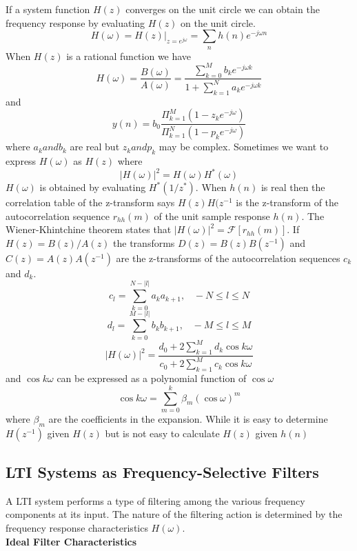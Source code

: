 \documentclass{article} %
\begin{document}
	If a system function $H(z)$ converges on the unit circle we can obtain the frequency response by evaluating $H(z)$ on the unit circle. 
	\begin{equation}
	H(\omega) = H(z)|_{z=e^{j\omega}} = \sum_n h(n)e^{-j\omega n}
	\end{equation}
	When $H(z)$ is a rational function we have
	\begin{equation}
	H(\omega) = \frac{B(\omega)}{A(\omega)} = \frac{\sum_{k=0}^M b_ke^{-j\omega k}}{1 + \sum_{k=1}^N a_k e^{-j\omega k}}
	\end{equation}
	and
	\begin{equation}
	y(n) = b_0 \frac{\Pi_{k=1}^M (1-z_ke^{-j\omega})}{\Pi_{k=1}^N (1-p_ke^{-j\omega})}
	\end{equation}
	where $a_k and b_k$ are real but $z_k and p_k$ may be complex. Sometimes we want to express $H(\omega)$ as $H(z)$ where 
	\begin{equation}
	|H(\omega)|^2 = H(\omega)H^*(\omega)
	\end{equation}
	$H(\omega)$ is obtained by evaluating $H^*(1/z^*)$. When $h(n)$ is real then the correlation table of the z-transform says $H(z)H(z^{-1}$ is the z-transform of the autocorrelation sequence $r_{hh}(m)$ of the unit sample response $h(n)$. The Wiener-Khintchine theorem states that $|H(\omega)|^2 = \mathcal{F}[r_{hh}(m)]$. If $H(z) = B(z)/A(z)$ the transforms $D(z)=B(z)B(z^{-1})$ and  $C(z)=A(z)A(z^{-1})$ are the z-transforms of the autocorrelation sequences $c_k$ and $d_k$. 
	\begin{equation}
	c_l = \sum_{k=0}^{N-|l|}a_ka_{k+1}, \;\;\; -N \le l \le N
	\end{equation}
	\begin{equation}
	d_l = \sum_{k=0}^{M-|l|}b_kb_{k+1}, \;\;\; -M \le l \le M
	\end{equation}
	\begin{equation}
	|H(\omega)|^2 = \frac{d_0 + 2\sum_{k=1}^M d_k \cos k\omega}{c_0 + 2\sum_{k=1}^M c_k \cos k\omega}
	\end{equation}
	and $\cos k\omega$ can be expressed as a polynomial function of $\cos \omega$
	\begin{equation}
	\cos k\omega = \sum_{m=0}^k \beta_m (\cos \omega)^m
	\end{equation}
	where $\beta_m$ are the coefficients in the expansion. While it is easy to determine $H(z^{-1})$ given $H(z)$ but is not easy to calculate $H(z)$ given $h(n)$
	
	\subsection{LTI Systems as Frequency-Selective Filters}
	A LTI system performs a type of filtering among the various frequency components at its input. The nature of the filtering action is determined by the frequency response characteristics $H(\omega)$. \\
	\textbf{Ideal Filter Characteristics}\\
	
\end{document}
